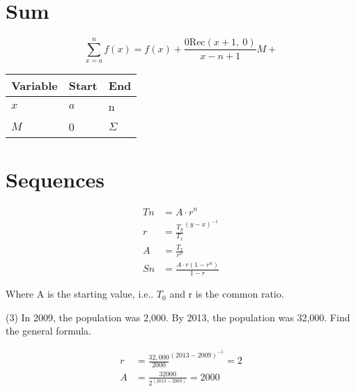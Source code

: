 \documentclass[11pt]{article}
\newcommand{\Rec}{\text{Rec}}
\begin{document}
    \section{Sum}\label{sec:sum}
    \[
        \sum_{x=a}^{n} f\left(x\right) =
        f(x) + \frac{0\Rec\left( x+1,~0\right)} {x - n+1} M+
    \]


    \begin{center}
        \begin{tabular}{|l|l|l|}
            \hline
            Variable & Start & End      \\
            \hline
            $x$      & $a$   & n        \\
            \hline
            $M$      & 0     & $\Sigma$ \\
            \hline
        \end{tabular}
    \end{center}


    \section{Sequences}\label{sec:sequences}
    \begin{align}
        Tn &=  A \cdot r^n \\
        r &=  {\frac {T_y} {T_x} } ^ { \left( y-x \right) ^ {-1} }  \\
        A &= \frac {T_x} {r^x}  \\
        Sn &= \frac{ A \cdot r \left( 1 - r^n \right) } { 1 - r }
    \end{align}

    Where A is the starting value, i.e.. $T_0$ and r is the common ratio.


    (3) In 2009, the population was 2,000.
    By 2013, the population was 32,000.
    Find the general formula.

    \begin{align}
        r &= { \frac {32,000} {2000} } ^ { \left( 2013-2009 \right) ^ {-1} } = 2 \\
        A &= { \frac {32000} {2 ^ {\left( 2013-2009 \right)} } } = 2000
    \end{align}
\end{document}
